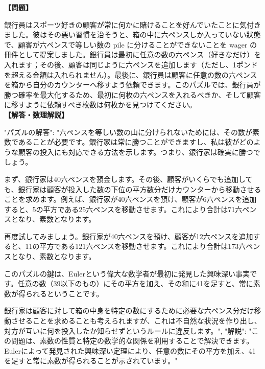\documentclass[10pt,a4paper,oneside,openany]{ltjsbook}
\begin{document}
\begin{tcolorbox}[colback=softblue,colframe=primaryblue,title=\textbf{第 134 問：THE BANKER'S PUZZLE.},arc=2mm,boxrule=1pt,breakable]
\textbf{【問題】}\par\vspace{0.3em}
銀行員はスポーツ好きの顧客が常に何かに賭けることを好んでいたことに気付きました。彼はその悪い習慣を治そうと、箱の中に六ペンスしか入っていない狀態で、顧客が六ペンスで等しい数の pile に分けることができないことを wager の冊件として提案しました。銀行員は最初に任意の数の六ペンス（好きなだけ）を入れます；その後、顧客は同じように六ペンスを追加します（ただし、1ポンドを超える金額は入れられません）。最後に、銀行員は顧客に任意の数の六ペンスを箱から自分のカウンターへ移すよう依頼できます。このパズルでは、銀行員が勝つ確率を最大化するため、最初に何枚の六ペンスを入れるべきか、そして顧客に移すように依頼すべき枚数は何枚かを見つけてください。
\tcblower
\textbf{【解答・数理解説】}\par\vspace{0.3em}
{
"パズルの解答": "六ペンスを等しい数の山に分けられないためには、その数が素数であることが必要です。銀行家は常に勝つことができますし、私は彼がどのような顧客の投入にも対応できる方法を示します。つまり、銀行家は確実に勝つでしょう。

まず、銀行家は40六ペンスを預金します。その後、顧客がいくらでも追加しても、銀行家は顧客が投入した数の下位の平方数分だけカウンターから移動させることを求めます。例えば、銀行家が40六ペンスを預け、顧客が6六ペンスを追加すると、5の平方である25六ペンスを移動させます。これにより合計は71六ペンスとなり、素数となります。

再度試してみましょう。銀行家が40六ペンスを預け、顧客が12六ペンスを追加すると、11の平方である121六ペンスを移動させます。これにより合計は173六ペンスとなり、素数となります。

このパズルの鍵は、Eulerという偉大な数学者が最初に発見した興味深い事実です。任意の数（39以下のもの）にその平方を加え、その和に41を足すと、常に素数が得られるということです。

銀行家は顧客に対して箱の中身を特定の数にするために必要な六ペンス分だけ移動させることを求めることも考えられますが、これは不自然な狀況を作り出し、対方が互いに何を投入したか知らせずというルールに違反します。",
"解説": "この問題は、素数の性質と特定の数学的な関係を利用することで解決できます。Eulerによって発見された興味深い定理により、任意の数にその平方を加え、41を足すと常に素数が得られることが示されています。"
}
\end{tcolorbox}
\end{document}
